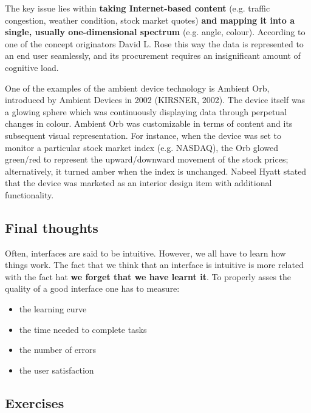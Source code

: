 The key issue lies within \textbf{taking Internet-based content} (e.g. traffic congestion, weather condition, stock market quotes) \textbf{and mapping it into a single, usually one-dimensional spectrum} (e.g. angle, colour). According to one of the concept originators David L. Rose this way the data is represented to an end user seamlessly, and its procurement requires an insignificant amount of cognitive load.

One of the examples of the ambient device technology is Ambient Orb, introduced by Ambient Devices in 2002 (KIRSNER, 2002). The device itself was a glowing sphere which was continuously displaying data through perpetual changes in colour. Ambient Orb was customizable in terms of content and its subsequent visual representation. For instance, when the device was set to monitor a particular stock market index (e.g. NASDAQ), the Orb glowed green/red to represent the upward/downward movement of the stock prices; alternatively, it turned amber when the index is unchanged. Nabeel Hyatt stated that the device was marketed as an interior design item with additional functionality.

\subsection{Final thoughts}

Often, interfaces are said to be intuitive. However, we all have to learn how things work. The fact that we think that an interface is intuitive is more related with the fact hat \textbf{we forget that we have learnt it}. To properly asses the quality of a good interface one has to measure:

\begin{itemize}
\item the learning curve
\item the time needed to complete tasks
\item the number of errors
\item the user satisfaction
\end{itemize}

\subsection{Exercises}

